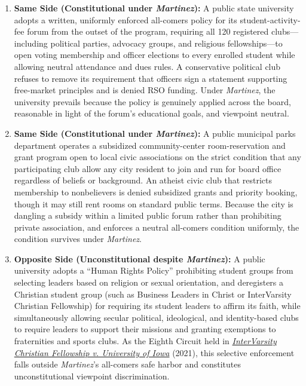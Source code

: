 \documentclass[12pt]{article}
\begin{document}
\begin{enumerate}
  \item \textbf{Same Side (Constitutional under \textit{Martinez}):} A public state university adopts a written, uniformly enforced all-comers policy for its student-activity-fee forum from the outset of the program, requiring all 120 registered clubs---including political parties, advocacy groups, and religious fellowships---to open voting membership and officer elections to every enrolled student while allowing neutral attendance and dues rules. A conservative political club refuses to remove its requirement that officers sign a statement supporting free-market principles and is denied RSO funding. Under \textit{Martinez}, the university prevails because the policy is genuinely applied across the board, reasonable in light of the forum's educational goals, and viewpoint neutral.

  \item \textbf{Same Side (Constitutional under \textit{Martinez}):} A public municipal parks department operates a subsidized community-center room-reservation and grant program open to local civic associations on the strict condition that any participating club allow any city resident to join and run for board office regardless of beliefs or background. An atheist civic club that restricts membership to nonbelievers is denied subsidized grants and priority booking, though it may still rent rooms on standard public terms. Because the city is dangling a subsidy within a limited public forum rather than prohibiting private association, and enforces a neutral all-comers condition uniformly, the condition survives under \textit{Martinez}.

  \item \textbf{Opposite Side (Unconstitutional despite \textit{Martinez}):} A public university adopts a ``Human Rights Policy'' prohibiting student groups from selecting leaders based on religion or sexual orientation, and deregisters a Christian student group (such as Business Leaders in Christ or InterVarsity Christian Fellowship) for requiring its student leaders to affirm its faith, while simultaneously allowing secular political, ideological, and identity-based clubs to require leaders to support their missions and granting exemptions to fraternities and sports clubs. As the Eighth Circuit held in \href{https://becketfund.org/case/intervarsity-christian-fellowship-v-university-iowa/}{\textit{InterVarsity Christian Fellowship v. University of Iowa}} (2021), this selective enforcement falls outside \textit{Martinez}'s all-comers safe harbor and constitutes unconstitutional viewpoint discrimination.


\end{enumerate}
\end{document}
